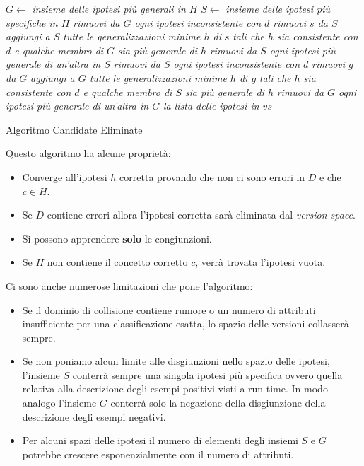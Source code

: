 \begin{algorithm}[H]
  \begin{algorithmic}
    \State $G\gets$ \textit{insieme delle ipotesi più generali in $H$}
    \State $S\gets$ \textit{insieme delle ipotesi più specifiche in $H$}
    \State \textit{rimuovi da $G$ ogni ipotesi inconsistente con $d$}
    \State \textit{rimuovi $s$ da $S$}
    \State
    \State \textit{aggiungi a $S$ tutte le generalizzazioni minime $h$ di $s$}
    \State \textit{tali che $h$ sia consistente con $d$ e qualche membro di $G$}
    \State \textit{sia più generale di $h$}
    \EndFor
    \State \textit{rimuovi da $S$ ogni ipotesi più generale di un'altra in $S$}
    \Else
    \State \textit{rimuovi da $S$ ogni ipotesi inconsistente con $d$}
    \State \textit{rimuovi $g$ da $G$}
    \State
    \State \textit{aggiungi a $G$ tutte le generalizzazioni minime $h$ di $g$}
    \State \textit{tali che $h$ sia consistente con $d$ e qualche membro di $S$}
    \State \textit{sia più generale di $h$}
    \EndFor
    \State \textit{rimuovi da $G$ ogni ipotesi più generale di un'altra in $G$}
    \EndIf
    \EndFor
    \Return \textit{la lista delle ipotesi in $vs$}
    \EndFunction
  \end{algorithmic}
  \caption{Algoritmo Candidate Eliminate}
\end{algorithm}
Questo algoritmo ha alcune proprietà:
\begin{itemize}
  \item Converge all'ipotesi $h$ corretta provando che non ci sono errori in $D$
  e che $c\in H$.
  \item Se $D$ contiene errori allora l'ipotesi corretta sarà eliminata dal
  \textit{version space}.
  \item Si possono apprendere \textbf{solo} le congiunzioni.
  \item Se $H$ non contiene il concetto corretto $c$, verrà trovata l'ipotesi
  vuota.
  \end{itemize}
  Ci sono anche numerose limitazioni che pone l'algoritmo:
  \begin{itemize}
  \item Se il dominio di collisione contiene rumore o un numero di attributi insufficiente per una classificazione esatta, lo spazio delle versioni collasserà sempre.
  \item Se non poniamo alcun limite alle disgiunzioni nello spazio delle ipotesi, l'insieme $S$ conterrà sempre una singola ipotesi più specifica ovvero quella relativa alla descrizione degli esempi positivi visti a run-time. In modo analogo l'insieme $G$ conterrà solo la negazione della disgiunzione della descrizione degli esempi negativi.
  \item Per alcuni spazi delle ipotesi il numero di elementi degli insiemi $S$ e $G$ potrebbe crescere esponenzialmente con il numero di attributi.
\end{itemize}
